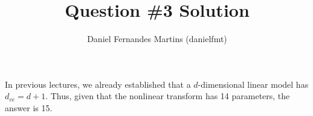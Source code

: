 \documentclass{article}
\author{Daniel Fernandes Martins (danielfmt)}
\title{Question \#3 Solution}
\begin{document}
\maketitle

In previous lectures, we already established that a $d$-dimensional linear
model has $d_{vc}=d+1$. Thus, given that the nonlinear transform has 14
parameters, the answer is 15.
\end{document}
